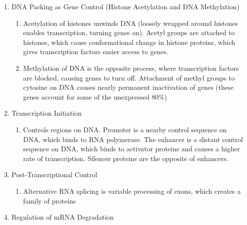 \documentclass[12pt]{article}
\begin{document}
\begin{itemize}
\begin{enumerate}
        \begin{enumerate}

          \item DNA Packing as Gene Control (Histone Acetylation and DNA Methylation)

            \begin{enumerate}

              \item Acetylation of histones unwinds DNA (loosely wrapped around histones enables transcription, turning genes on). Acetyl groups are attached to histones, which cause conformational change in histone proteins, which gives transcription factors easier access to genes.

              \item Methylation of DNA is the opposite process, where transcription factors are blocked, causing genes to turn off. Attachment of methyl groups to cytosine on DNA causes nearly permanent inactivation of genes (these genes account for some of the unexpressed 80\%)

            \end{enumerate}

          \item Transcription Initiation

            \begin{enumerate}

              \item Controls regions on DNA. Promoter is a nearby control sequence on DNA, which binds to RNA polymerase. The enhancer is a distant control sequence on DNA, which binds to activator proteins and causes a higher rate of transcription. Silencer proteins are the opposite of enhancers.

            \end{enumerate}

          \item Post-Transcriptional Control

            \begin{enumerate}

              \item Alternative RNA splicing is variable processing of exons, which creates a family of proteins

            \end{enumerate}

          \item Regulation of mRNA Degradation


\end{enumerate}
\end{enumerate}
\end{itemize}
\end{document}
